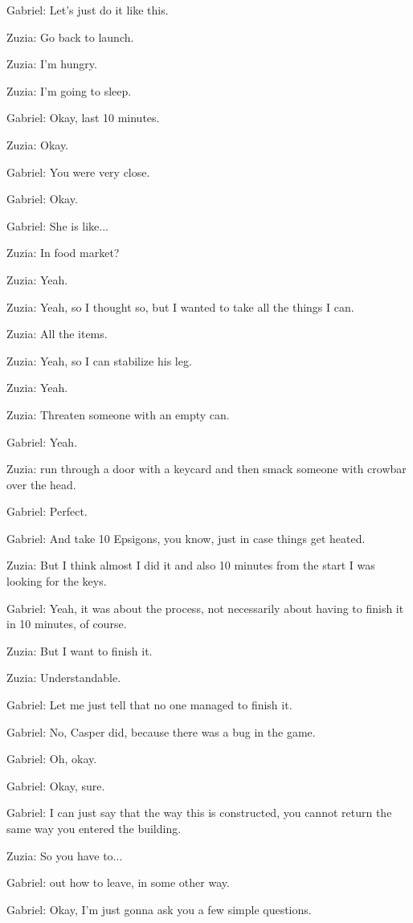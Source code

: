 Gabriel: Let's just do it like this.

Zuzia: Go back to launch.

Zuzia: I'm hungry.

Zuzia: I'm going to sleep.

Gabriel: Okay, last 10 minutes.

Zuzia: Okay.

Gabriel: You were very close.

Gabriel: Okay.

Gabriel: She is like...

Zuzia: In food market?

Zuzia: Yeah.

Zuzia: Yeah, so I thought so, but I wanted to take all the things I can.

Zuzia: All the items.

Zuzia: Yeah, so I can stabilize his leg.

Zuzia: Yeah.

Zuzia: Threaten someone with an empty can.

Gabriel: Yeah.

Zuzia: run through a door with a keycard and then smack someone with crowbar over the head.

Gabriel: Perfect.

Gabriel: And take 10 Epsigons, you know, just in case things get heated.

Zuzia: But I think almost I did it and also 10 minutes from the start I was looking for the keys.

Gabriel: Yeah, it was about the process, not necessarily about having to finish it in 10 minutes, of course.

Zuzia: But I want to finish it.

Zuzia: Understandable.

Gabriel: Let me just tell that no one managed to finish it.

Gabriel: No, Casper did, because there was a bug in the game.

Gabriel: Oh, okay.

Gabriel: Okay, sure.

Gabriel: I can just say that the way this is constructed, you cannot return the same way you entered the building.

Zuzia: So you have to...

Gabriel: out how to leave, in some other way.

Gabriel: Okay, I'm just gonna ask you a few simple questions.

